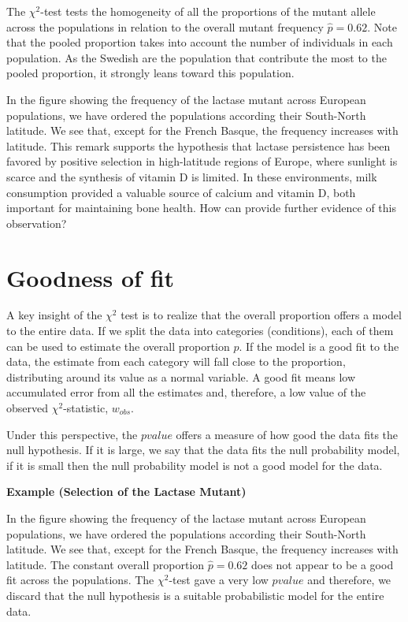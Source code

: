 \documentclass[
]{book}
\begin{document}
The \(\chi^2\)-test tests the homogeneity of all the proportions of the mutant allele across the populations in relation to the overall mutant frequency \(\hat{p}=0.62\). Note that the pooled proportion takes into account the number of individuals in each population. As the Swedish are the population that contribute the most to the pooled proportion, it strongly leans toward this population.

In the figure showing the frequency of the lactase mutant across European populations, we have ordered the populations according their South-North latitude. We see that, except for the French Basque, the frequency increases with latitude. This remark supports the hypothesis that lactase persistence has been favored by positive selection in high-latitude regions of Europe, where sunlight is scarce and the synthesis of vitamin D is limited. In these environments, milk consumption provided a valuable source of calcium and vitamin D, both important for maintaining bone health. How can provide further evidence of this observation?

\hypertarget{goodness-of-fit}{%
\section{Goodness of fit}\label{goodness-of-fit}}

A key insight of the \(\chi^2\) test is to realize that the overall proportion offers a model to the entire data. If we split the data into categories (conditions), each of them can be used to estimate the overall proportion \(p\). If the model is a good fit to the data, the estimate from each category will fall close to the proportion, distributing around its value as a normal variable. A good fit means low accumulated error from all the estimates and, therefore, a low value of the observed \(\chi^2\)-statistic, \(w_{obs}\).

Under this perspective, the \(pvalue\) offers a measure of how good the data fits the null hypothesis. If it is large, we say that the data fits the null probability model, if it is small then the null probability model is not a good model for the data.

\textbf{Example (Selection of the Lactase Mutant)}

In the figure showing the frequency of the lactase mutant across European populations, we have ordered the populations according their South-North latitude. We see that, except for the French Basque, the frequency increases with latitude. The constant overall proportion \(\hat{p}=0.62\) does not appear to be a good fit across the populations. The \(\chi^2\)-test gave a very low \(pvalue\) and therefore, we discard that the null hypothesis is a suitable probabilistic model for the entire data.
\end{document}
